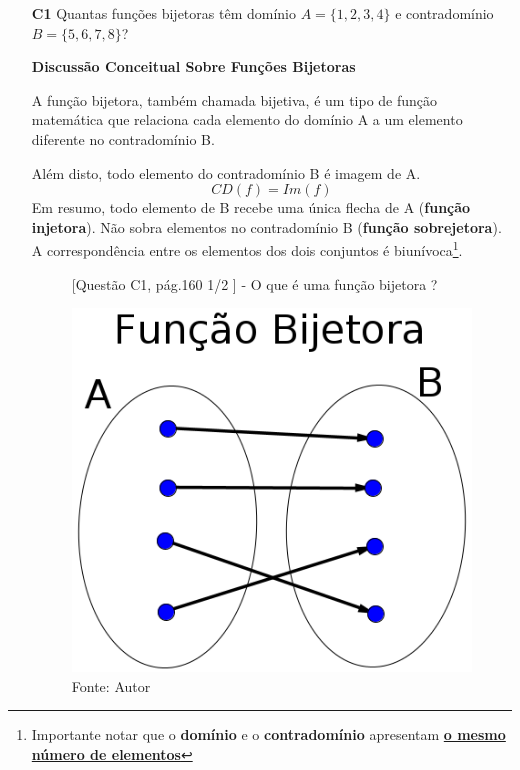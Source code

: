 \documentclass[a4paper,12pt]{article}
\begin{document}
\begin{enumerate}

\item[\textbf{C1}] Quantas funções bijetoras têm domínio $A = \{1, 2, 3, 4 \}$ e contradomínio $B = \{5, 6, 7, 8 \}$?

\begin{center}
{\large \textbf{Discussão Conceitual Sobre Funções Bijetoras}}
\end{center}

A função bijetora, também chamada bijetiva, é um tipo de função matemática que relaciona cada elemento do domínio A a um elemento diferente no contradomínio B.

Além disto, todo elemento do contradomínio B é imagem de A.
                             $$CD (f) = Im(f)$$
Em resumo, todo elemento de B recebe uma única flecha de A (\textbf{função injetora}). Não sobra elementos no contradomínio B (\textbf{função sobrejetora}). A correspondência entre os elementos dos dois conjuntos é biunívoca\footnote{Importante notar que o \textbf{domínio} e o \textbf{contradomínio} apresentam \textbf{\underline{o mesmo número de elementos}}}.

   \begin{figure}[!htb]
      \centering
      \caption{[Questão C1, pág.160 1/2 ] - O que é uma função bijetora ?}
      \includegraphics[scale=0.3]{../../imagens/cap21-exercicios-C1-pag160-1.png}
      \caption*{Fonte: Autor}
      \label{cap21-exercicios-C1-pag160-1}
    \end{figure}
    

\end{enumerate}
\end{document}
